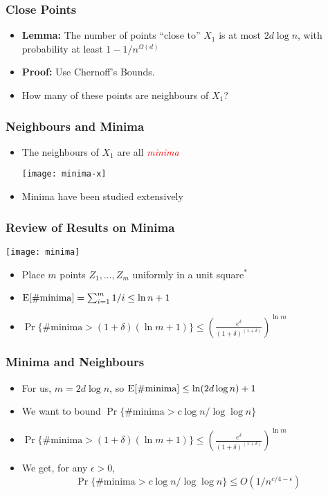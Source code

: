 \documentclass{beamer}
\renewcommand{\emph}[1]{\textcolor{red}{\it #1}}
\begin{document}
\frame
{
  \frametitle{Close Points}


   \begin{itemize}
     \item
       \textbf{Lemma:} The number of points ``close to'' $X_1$ is at most
$2d\log n$, with probability at least $1-1/n^{\Omega(d)}$

     \item \textbf{Proof:} Use Chernoff's Bounds.
     \item How many of these points are neighbours of $X_1$?
     \end{itemize}
}

\frame
{
  \frametitle{Neighbours and Minima}

   \begin{itemize}
     \item The neighbours of $X_1$ are all \emph{minima}
      \begin{center}
        \texttt{[image: minima-x]}
      \end{center}
     \item Minima have been studied extensively
   \end{itemize}

}

\frame
{
  \frametitle{Review of Results on Minima}

   \begin{center} \texttt{[image: minima]} \end{center}
   \begin{itemize}
     \item Place $m$ points $Z_1,\ldots,Z_m$ uniformly in a unit square$^{*}$
     \item $\mathrm{E}[\mbox{\#minima}] =\sum_{i=1}^m 1/i \le \ln n + 1$
     \item $\Pr\{\mbox{\#minima} > (1+\delta)(\ln m +1)\} \le 
         \left(\frac{e^{\delta}}{(1+\delta)^{(1+\delta)}}\right)^{\ln m}$
   \end{itemize}
}

\frame
{
  \frametitle{Minima and Neighbours}

   \begin{itemize}
     \item For us, $m=2d\log n$, so $\mathrm{E}[\mbox{\#minima}] \le \ln(2d\log n) +1$
     \item We want to bound $\Pr\{\mbox{\#minima} > c\log n/\log\log n\}$
     \item $\Pr\{\mbox{\#minima} > (1+\delta)(\ln m +1)\} \le 
         \left(\frac{e^{\delta}}{(1+\delta)^{(1+\delta)}}\right)^{\ln m}$
     \item We get, for any $\epsilon > 0$,
       \[\Pr\{\mbox{\#minima} > c\log n/\log\log n\}
         \le O(1/n^{c/4-\epsilon}) \]
   \end{itemize}
}
\end{document}
